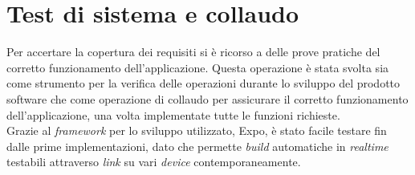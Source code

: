 \section{Test di sistema e collaudo}
Per accertare la copertura dei requisiti si è ricorso a delle prove pratiche del corretto funzionamento dell’applicazione. Questa operazione è stata svolta sia come strumento per la verifica delle operazioni durante lo sviluppo del prodotto software che come operazione di collaudo per assicurare il corretto funzionamento dell'applicazione, una volta implementate tutte le funzioni richieste. \\
Grazie al \emph{framework} per lo sviluppo utilizzato, Expo, è stato facile testare fin dalle prime implementazioni, dato che permette \emph{build} automatiche in \emph{realtime} testabili attraverso \emph{link} su vari \emph{device} contemporaneamente.

